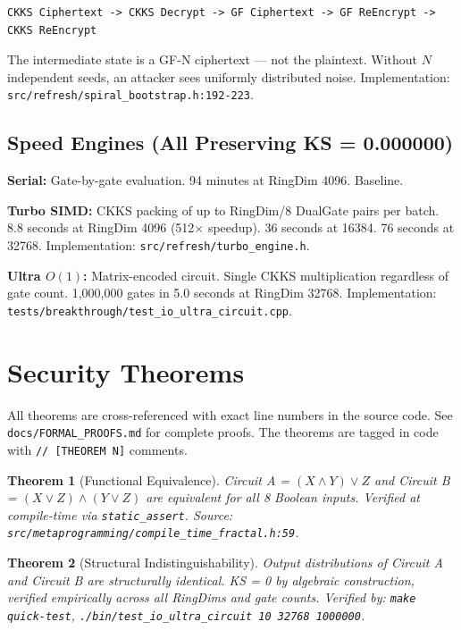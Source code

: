 \documentclass[11pt,a4paper]{article}
\newtheorem{theorem}{Theorem}[section]
\begin{document}
\begin{verbatim}
CKKS Ciphertext -> CKKS Decrypt -> GF Ciphertext -> GF ReEncrypt -> CKKS ReEncrypt
\end{verbatim}

The intermediate state is a GF-N ciphertext --- not the plaintext. Without $N$ independent seeds, an attacker sees uniformly distributed noise. Implementation: \texttt{src/refresh/spiral\_bootstrap.h:192-223}.

\subsection{Speed Engines (All Preserving KS = 0.000000)}

\textbf{Serial:} Gate-by-gate evaluation. 94 minutes at RingDim 4096. Baseline.

\textbf{Turbo SIMD:} CKKS packing of up to RingDim/8 DualGate pairs per batch. 8.8 seconds at RingDim 4096 (512$\times$ speedup). 36 seconds at 16384. 76 seconds at 32768. Implementation: \texttt{src/refresh/turbo\_engine.h}.

\textbf{Ultra $O(1)$:} Matrix-encoded circuit. Single CKKS multiplication regardless of gate count. 1,000,000 gates in 5.0 seconds at RingDim 32768. Implementation: \texttt{tests/breakthrough/test\_io\_ultra\_circuit.cpp}.

\section{Security Theorems}

All theorems are cross-referenced with exact line numbers in the source code. See \texttt{docs/FORMAL\_PROOFS.md} for complete proofs. The theorems are tagged in code with \texttt{// [THEOREM N]} comments.

\begin{theorem}[Functional Equivalence]
Circuit A = $(X \land Y) \lor Z$ and Circuit B = $(X \lor Z) \land (Y \lor Z)$ are equivalent for all 8 Boolean inputs. Verified at compile-time via \texttt{static\_assert}. Source: \texttt{src/metaprogramming/compile\_time\_fractal.h:59}.
\end{theorem}

\begin{theorem}[Structural Indistinguishability]
Output distributions of Circuit A and Circuit B are structurally identical. KS = 0 by algebraic construction, verified empirically across all RingDims and gate counts. Verified by: \texttt{make quick-test}, \texttt{./bin/test\_io\_ultra\_circuit 10 32768 1000000}.
\end{theorem}
\end{document}

